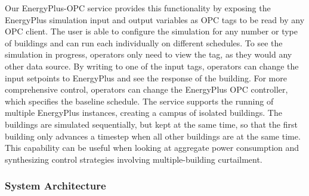Our EnergyPlus-OPC service provides this functionality by exposing the EnergyPlus simulation input and output variables as OPC tags to be read by any OPC client. The user is able to configure the simulation for any number or type of buildings and can run each individually on different schedules. To see the simulation in progress, operators only need to view the tag, as they would any other data source. By writing to one of the input tags, operators can change the input setpoints to EnergyPlus and see the response of the building. For more comprehensive control, operators can change the EnergyPlus OPC controller, which specifies the baseline schedule.
The service supports the running of multiple EnergyPlus instances, creating a campus of isolated buildings. The buildings are simulated sequentially, but kept at the same time, so that the first building only advances a timestep when all other buildings are at the same time. This capability can be useful when looking at aggregate power consumption and synthesizing control strategies involving multiple-building curtailment.
\subsubsection{System Architecture}

